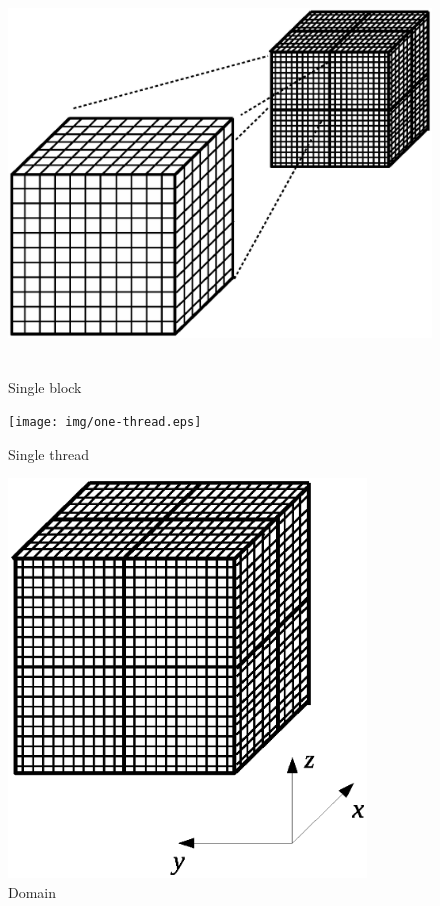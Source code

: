 \documentclass{report}
\begin{document}
\begin{figure}[h]
\begin{center}
\includegraphics[trim={{100pt} {150pt} {100pt} {150pt}}, clip, height=300pt]{img/one-block.eps}
\end{center}
\caption{Single block}
\label{fig:one-block}
\end{figure}




\begin{figure}[h]
\begin{center}
\texttt{[image: img/one-thread.eps]}
\end{center}
\caption{Single thread}
\label{fig:one-thread}
\end{figure}




\begin{figure}[h]
\begin{center}
\includegraphics[trim={{100pt} {150pt} {100pt} {150pt}}, clip, height=300pt]{img/domain.eps}
\end{center}
\caption{Domain}
\label{fig:domain}
\end{figure}
\end{document}
